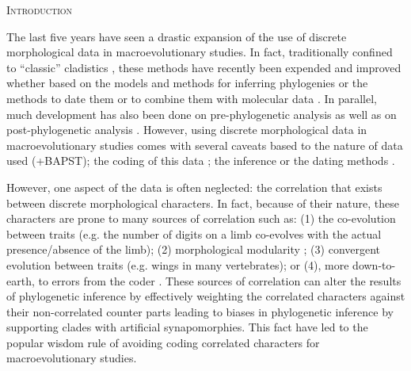 \documentclass[12pt,letterpaper]{article}
\renewcommand{\section}[1]{%
\bigskip
\begin{center}
\begin{Large}
\normalfont\scshape #1
\medskip
\end{Large}
\end{center}}
\begin{document}
\section{Introduction}

The last five years have seen a drastic expansion of the use of discrete morphological data in macroevolutionary studies.
In fact, traditionally confined to ``classic'' cladistics \citep{felsenstein2004inferring}, these methods have recently been expended and improved whether based on the models and methods for inferring phylogenies \citep{lewisa2001,Wright01072016} or the methods to date them \citep[e.g.][]{bapsta2013} or to combine them with molecular data \citep{pyrondivergence2011,ronquista2012}.
In parallel, much development has also been done on pre-phylogenetic analysis \citep[e.g. data collection;][]{morphobank} as well as on post-phylogenetic analysis \citep[e.g. morphological disparity analysis;][]{Close2015,Claddis}.
However, using discrete morphological data in macroevolutionary studies comes with several caveats based to the nature of data used \citep{Guillerme2016146}(+BAPST); the coding of this data \citep{Brazeau2011}; the inference \citep{spencerefficacy2013,wrightbayesian2014,OReilly20160081} or the dating methods \citep{Arcila2015131}.

However, one aspect of the data is often neglected: the correlation that exists between discrete morphological characters.
In fact, because of their nature, these characters are prone to many sources of correlation such as: (1) the co-evolution between traits (e.g. the number of digits on a limb co-evolves with the actual presence/absence of the limb); (2) morphological modularity \citep[i.e. the unity of entire morphological regions][]{goswami2006morphological}; (3) convergent evolution between traits (e.g. wings in many vertebrates); or (4), more down-to-earth, to errors from the coder \citep[e.g. the repetition of the same character described slighlty differently each case][]{Brazeau2011}.
These sources of correlation can alter the results of phylogenetic inference by effectively weighting the correlated characters against their non-correlated counter parts leading to biases in phylogenetic inference by supporting clades with artificial synapomorphies.
This fact have led to the popular wisdom rule of avoiding coding correlated characters for macroevolutionary studies.
\end{document}
